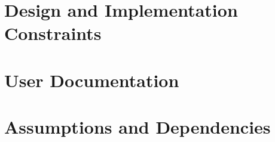 \section{Design and Implementation Constraints}

\section{User Documentation}

\section{Assumptions and Dependencies}

